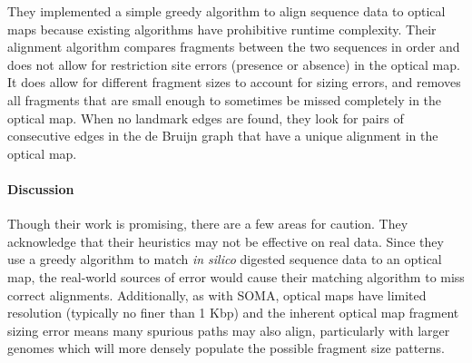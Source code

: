 They implemented a simple greedy algorithm to align sequence data to optical maps because existing algorithms have prohibitive runtime complexity.
Their alignment algorithm compares fragments between the two sequences in order and does not allow for restriction site errors (presence or absence) in the optical map.
It does allow for different fragment sizes to account for sizing errors, and removes all fragments that are small enough to sometimes be missed completely in the optical map.
When no landmark edges are found, they look for pairs of consecutive edges in the de Bruijn graph that have a unique alignment in the optical map.



\paragraph{Discussion}

Though their work is promising, there are a few areas for caution.  They acknowledge that their heuristics may not be effective on real data. Since they use a greedy algorithm to match \emph{in silico} digested sequence data to an optical map, the real-world sources of error would cause their matching algorithm to miss correct alignments. Additionally, as with SOMA, optical maps have limited resolution (typically no finer than 1 Kbp) and the inherent optical map fragment sizing error means many spurious paths may also align, particularly with larger genomes which will more densely populate the possible fragment size patterns.


